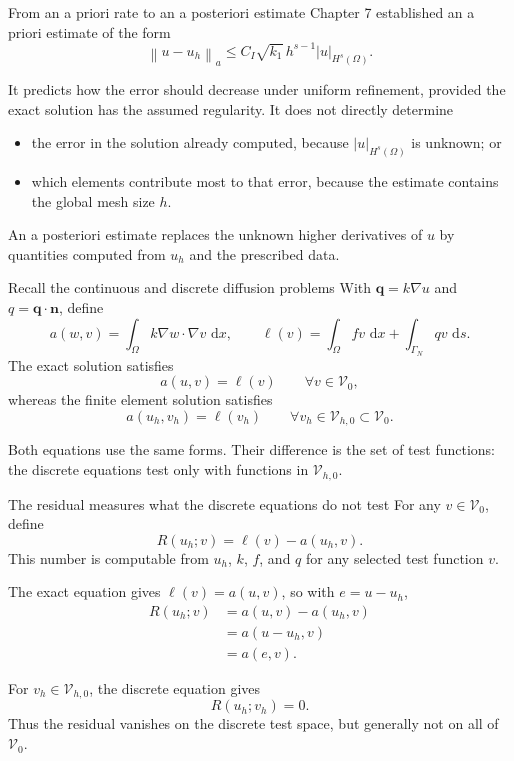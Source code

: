 \documentclass[11pt,aspectratio=169]{beamer}
\newcommand{\dd}{\,\mathrm{d}}
\newcommand{\Om}{\Omega}
\newcommand{\GamN}{\Gamma_N}
\newcommand{\Vzero}{\mathcal V_0}
\newcommand{\Vhzero}{\mathcal V_{h,0}}
\newcommand{\norm}[2][]{\left\lVert#2\right\rVert_{#1}}
\newcommand{\seminorm}[2][]{\left\lvert#2\right\rvert_{#1}}
\newcommand{\grad}{\nabla}
\newcommand{\bn}{\bm n}
\newcommand{\bq}{\bm q}
\begin{document}
\begin{frame}{From an a priori rate to an a posteriori estimate}
Chapter 7 established an a priori estimate of the form
\[
  \norm[a]{u-u_h}
  \leq C_I\sqrt{k_1}\,h^{s-1}\seminorm[H^s(\Om)]{u}.
\]

It predicts how the error should decrease under uniform refinement, provided
the exact solution has the assumed regularity. It does not directly determine

\begin{itemize}
  \item the error in the solution already computed, because
  $\seminorm[H^s(\Om)]{u}$ is unknown; or
  \item which elements contribute most to that error, because the estimate
  contains the global mesh size $h$.
\end{itemize}

\vspace{0.2cm}
An a posteriori estimate replaces the unknown higher derivatives of $u$ by
quantities computed from $u_h$ and the prescribed data.
\end{frame}

\begin{frame}{Recall the continuous and discrete diffusion problems}
With $\bq=k\grad u$ and $q=\bq\cdot\bn$, define
\[
  a(w,v)=\int_\Om k\grad w\cdot\grad v\,\dd x,
  \qquad
  \ell(v)=\int_\Om fv\,\dd x+\int_{\GamN}qv\,\dd s.
\]
The exact solution satisfies
\[
  a(u,v)=\ell(v)
  \qquad\forall v\in\Vzero,
\]
whereas the finite element solution satisfies
\[
  a(u_h,v_h)=\ell(v_h)
  \qquad\forall v_h\in\Vhzero\subset\Vzero.
\]

\vspace{0.2cm}
Both equations use the same forms. Their difference is the set of test
functions: the discrete equations test only with functions in $\Vhzero$.
\end{frame}

\begin{frame}{The residual measures what the discrete equations do not test}
For any $v\in\Vzero$, define
\[
  \boxed{R(u_h;v)=\ell(v)-a(u_h,v).}
\]
This number is computable from $u_h$, $k$, $f$, and $q$ for any selected test
function $v$.

\vspace{0.25cm}
The exact equation gives $\ell(v)=a(u,v)$, so with $e=u-u_h$,
\[
\begin{aligned}
  R(u_h;v)
  &=a(u,v)-a(u_h,v)\\
  &=a(u-u_h,v)\\
  &=\boxed{a(e,v)}.
\end{aligned}
\]

For $v_h\in\Vhzero$, the discrete equation gives
\[
  R(u_h;v_h)=0.
\]
Thus the residual vanishes on the discrete test space, but generally not on
all of $\Vzero$.
\end{frame}
\end{document}
